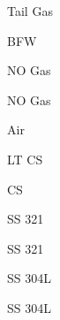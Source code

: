 \documentclass[a4paper,portrait,12pt]{article}
\begin{document}
\begin{flushleft}
Tail Gas
\end{flushleft}





\begin{flushleft}
BFW
\end{flushleft}





\begin{flushleft}
NO Gas
\end{flushleft}





\begin{flushleft}
NO Gas
\end{flushleft}





\begin{flushleft}
Air
\end{flushleft}





\begin{flushleft}
LT CS
\end{flushleft}





\begin{flushleft}
CS
\end{flushleft}





\begin{flushleft}
SS 321
\end{flushleft}





\begin{flushleft}
SS 321
\end{flushleft}





\begin{flushleft}
SS 304L
\end{flushleft}





\begin{flushleft}
SS 304L
\end{flushleft}
\end{document}
